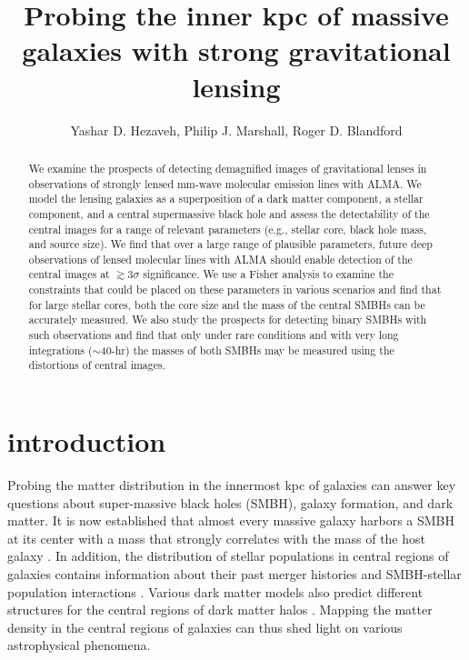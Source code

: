 \documentclass[chicago]{emulateapj}
\begin{document}
\title{Probing the inner kpc of massive galaxies with strong gravitational lensing}
\author{Yashar D. Hezaveh, Philip J. Marshall, Roger D. Blandford}  

\begin{abstract} 

\noindent We examine the prospects of detecting demagnified images 
of gravitational lenses in observations of strongly lensed mm-wave 
molecular emission lines with ALMA. We model the lensing galaxies 
as a superposition of a dark matter component, a stellar component, 
and a central supermassive black hole and assess the detectability 
of the central images for a range of relevant parameters (e.g., 
stellar core, black hole mass, and source size). 
We find that over a large range 
of plausible parameters, future deep observations of lensed 
molecular lines with ALMA should enable detection of the central 
images at $\gtrsim 3\sigma$ significance. 
We use a Fisher analysis 
to examine the constraints that could be placed on these parameters 
in various scenarios and find that for large stellar cores, both 
the core size and the mass of the central SMBHs can be accurately 
measured. 
We also study the prospects for detecting binary SMBHs 
with such observations and find that only under rare conditions and 
with very long integrations ($\sim$40-hr) the masses of both SMBHs 
may be measured using the distortions of central images.

\end{abstract}






\section{introduction}

Probing the matter distribution in the innermost kpc of galaxies can answer key questions about super-massive black holes (SMBH), galaxy formation, and dark matter. It is now established that almost every massive galaxy harbors a SMBH at its center with a mass that strongly correlates with the mass of the host galaxy \citep{Kormendy:95,Ferrarese:00,Gebhardt:00,Tremaine:02}.
In addition, the distribution of stellar populations in central regions of galaxies contains information about their past merger histories and SMBH-stellar population interactions \citep[e.g.,][]{Barnes:92,Ebisuzaki:91,Barnabe:14}.  Various dark matter models also predict different structures for the central regions of dark matter halos \citep[e.g.,][]{Rocha:13}.  Mapping the matter density in the central regions of galaxies can thus shed light on various astrophysical phenomena.
\end{document}
